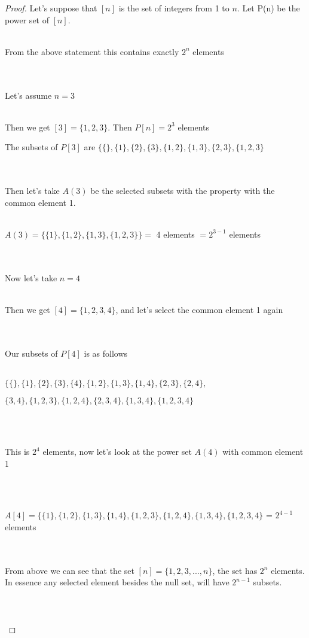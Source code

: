 \documentclass[12pt]{article}
\begin{document}
\begin{proof}
Let's suppose that $[n]$ is the set of integers from 1 to $n$. Let P(n) be the power set of $[n]$. \\ \\
\centerline{From the above statement this contains exactly $2^n$ elements} \\ \\
Let's assume $n=3$ \\ \\
\centerline{Then we get $[3] = \{1,2,3\}$. Then $P[n] = 2^3$ elements}
\centerline{The subsets of $P[3]$ are  $\{ \{ \}, \{1\}, \{2\}, \{3\}, \{1,2\}, \{1,3\}, \{2,3\}, \{1,2,3\}$} \\ \\
Then let's take $A(3)$ be the selected subsets with the property with the common element 1. \\ \\
\centerline{$A(3) = \{ \{1\}, \{1,2\}, \{1,3\}, \{1,2,3\} \} =$ 4 elements $= 2^{3-1}$ elements} \\ \\
Now let's take $n=4$ \\ \\
\centerline{Then we get $[4] = \{1,2,3,4\}$, and let's select the common element 1 again} \\ \\
Our subsets of $P[4]$ is as follows \\ \\
\centerline{$\{ \{ \}, \{1\}, \{2\}, \{3\}, \{4\}, \{1,2\}, \{1,3\}, \{1,4\}, \{2,3\}, \{2,4\},$}
\centerline{$\{3,4\}, \{1,2,3\}, \{1,2,4\}, \{2,3,4\}, \{1,3,4\}, \{1,2,3,4\}$} \\ \\
\centerline{This is $2^4$ elements, now let's look at the power set $A(4)$ with common element 1} \\ \\
\centerline{$A[4] = \{ \{1\}, \{1,2\}, \{1,3\}, \{1,4\}, \{1,2,3\}, \{1,2,4\}, \{1,3,4\}, \{1,2,3,4\}$ = $2^{4-1}$ elements} \\ \\
From above we can see that the set $[n] = \{1,2,3,...,n\}$, the set has $2^n$ elements. In essence any selected element besides the null set, will have $2^{n-1}$ subsets. \\ \\
 \\ \\

\end{proof}
\end{document}
